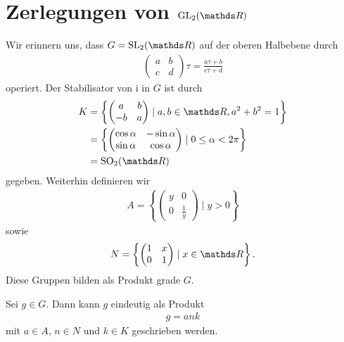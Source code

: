 \chapter{Zerlegungen von $\GL_2(\R)$}
Wir erinnern uns, dass $G=\SL_2(\R)$ auf der oberen Halbebene durch
\begin{align*}
\begin{pmatrix}
a&b\\
c&d
\end{pmatrix}\tau=\frac{a\tau+b}{c\tau+d}
\end{align*}
operiert.
Der Stabilisator von $\mathrm{i}$ in $G$ ist durch
\begin{align*}
K&=\left\lbrace \begin{pmatrix}
a&b\\
-b&a
\end{pmatrix}\mid a,b\in \R, a^2+b^2=1\right\rbrace\\
&=\left\lbrace \begin{pmatrix}
\cos \alpha &-\sin \alpha \\
\sin \alpha & \cos \alpha
\end{pmatrix} \mid 0\leq \alpha <2\pi\right\rbrace\\
&=\SO_2(\R)
\end{align*}
gegeben.
Weiterhin definieren wir
\begin{align*}
A=\left\lbrace \begin{pmatrix}
y&0\\
0&\frac{1}{y} 
\end{pmatrix} \mid y>0 \right\rbrace
\end{align*}
sowie
\begin{align*}
N=\left\lbrace 
\begin{pmatrix}
1&x\\
0&1
\end{pmatrix} \mid x\in \R\right\rbrace.
\end{align*}
Diese Gruppen bilden als Produkt grade $G$.
\begin{prop}
Sei $g\in G$. Dann kann $g$ eindeutig als Produkt
\begin{align*}
g=ank
\end{align*}
mit $a \in A$, $n\in N$ und $k \in K$ geschrieben werden.
\end{prop}

